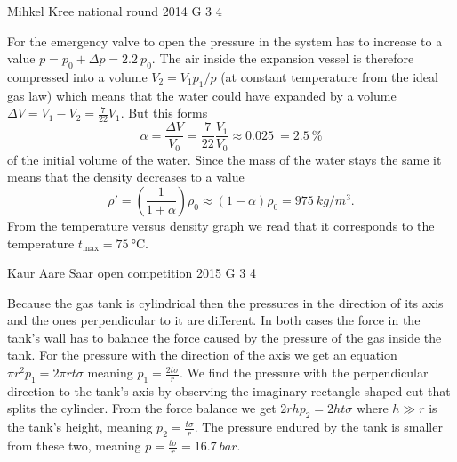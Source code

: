 \documentclass[11pt]{article}
\begin{document}
{Mihkel Kree} %
{national round} %
{2014} %
{G 3} %
{4} %
{

\ifEngSolution
For the emergency valve to open the pressure in the system has to increase to a value $p=p_0+\Delta p = \SI{2.2}{}p_0$. The air inside the expansion vessel is therefore compressed into a volume $V_2=V_1 p_1/p$ (at constant temperature from the ideal gas law) which means that the water could have expanded by a volume $\Delta V = V_1-V_2 = \frac{7}{22}V_1$. But this forms
\[\alpha = \frac{\Delta V}{V_0}= \frac{7}{22}\frac{V_1}{V_0}\approx \SI{0.025}{} =  \SI{2.5}{}\%\] 
of the initial volume of the water.  Since the mass of the water stays the same it means that the density decreases to a value
\[\rho'=\left(\frac{1}{1+\alpha}\right)\rho_0\approx(1-\alpha)\rho_0= \SI{975}{kg/m^3}.\] 
From the temperature versus density graph we read that it corresponds to the temperature $t_\text{max}=\SI{75}{\celsius}$.
\fi
}

{Kaur Aare Saar} %
{open competition} %
{2015} %
{G 3} %
{4} %
{

\ifEngSolution
Because the gas tank is cylindrical then the pressures in the direction of its axis and the ones perpendicular to it are different. In both cases the force in the tank’s wall has to balance the force caused by the pressure of the gas inside the tank. For the pressure with the direction of the axis we get an equation $\pi r^2 p_1=2\pi rt\sigma$ meaning $p_1=\frac{2t\sigma}{r}$. We find the pressure with the perpendicular direction to the tank’s axis by observing the imaginary rectangle-shaped cut that splits the cylinder. From the force balance we get $2rhp_2=2ht\sigma$ where $h\gg r$ is the tank’s height, meaning $p_2=\frac{t\sigma}{r}$. The pressure endured by the tank is smaller from these two, meaning $p=\frac{t\sigma}{r}=\SI{16,7}{bar}$.
\fi
}
\end{document}
